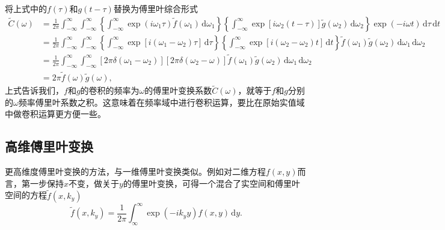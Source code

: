 将上式中的$f(\tau)$和$g(t - \tau)$替换为傅里叶综合形式
\begin{equation*}
\begin{split}
  \widetilde{C} \left( \omega \right) & =
  \frac{1}{2 \pi} \int_{-\infty}^{\infty}
  \int_{-\infty}^{\infty}
  \left\{
  \int_{-\infty}^{\infty}
  \exp \left( i \omega_{1} \tau \right)
  \tilde{f} \left( \omega_{1} \right)
  \, \mathrm{d} \omega_{1}
  \right\}
  \left\{
  \int_{-\infty}^{\infty}
  \exp \left[ i \omega_{2} \left( t - \tau \right)  \right]
  \tilde{g} \left( \omega_{2} \right)
  \, \mathrm{d} \omega_{2}
  \right\}
  \exp \left( - i \omega t \right)
  \, \mathrm{d} \tau
  \, \mathrm{d} t \\
  & = \frac{1}{2 \pi} \int_{-\infty}^{\infty}
  \int_{-\infty}^{\infty}
  \left\{
  \int_{-\infty}^{\infty}
  \exp \left[
  i \left( \omega_{1} - \omega_{2} \right) \tau
  \right]
  \, \mathrm{d} \tau
  \right\}
  \left\{
  \int_{-\infty}^{\infty}
  \exp \left[
  i \left( \omega_{2} - \omega_{2} \right) t
  \right]
  \, \mathrm{d} t
  \right\}
  \tilde{f} \left( \omega_{1} \right)
  \tilde{g} \left( \omega_{2} \right)
  \, \mathrm{d} \omega_{1}
  \, \mathrm{d} \omega_{2} \\
  & = \frac{1}{2 \pi} \int_{-\infty}^{\infty}
  \int_{-\infty}^{\infty}
  \left[ 2 \pi \delta \left( \omega_{1} - \omega_{2} \right) \right]
  \left[ 2 \pi \delta \left( \omega_{2} - \omega \right) \right]
  \tilde{f} \left( \omega_{1} \right)
  \tilde{g} \left( \omega_{2} \right)
  \, \mathrm{d} \omega_{1}
  \, \mathrm{d} \omega_{2} \\
  & = 2 \pi
  \tilde{f} \left( \omega \right)
  \tilde{g} \left( \omega \right),
\end{split}
\end{equation*}
上式告诉我们，$f$和$g$的卷积的频率为$\omega$的傅里叶变换系数$\widetilde{C}\left( \omega \right)$，就等于$f$和$g$分别的$\omega$频率傅里叶系数之积。这意味着在频率域中进行卷积运算，要比在原始实值域中做卷积运算更方便一些。

\subsection{高维傅里叶变换}
\label{eq:fourier-transform-higher}
更高维度傅里叶变换的方法，与一维傅里叶变换类似。例如对二维方程$f(x,y)$而言，第一步保持$x$不变，做关于$y$的傅里叶变换，可得一个混合了实空间和傅里叶空间的方程$\tilde{f} \left( x,k_{y} \right)$
\begin{equation*}
\tilde{f} \left( x , k_{y} \right) = \frac{1}{2 \pi}
\int_{\infty}^{\infty} \exp \left( - i k_{y} y \right) f \left( x,y \right) \, \mathrm{d} y.
\end{equation*}

